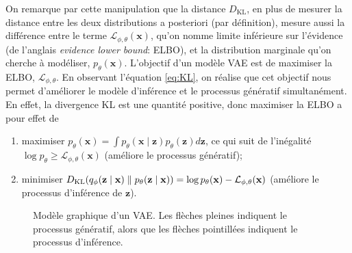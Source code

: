 On remarque par cette manipulation que la distance $D_{\mathrm{KL}}$, en plus de mesurer la distance entre 
les deux distributions a posteriori (par définition), mesure aussi la différence entre le terme 
$\mathcal{L}_{\phi,\theta}(\mathbf{x})$, qu'on nomme limite inférieure sur l'évidence (de l'anglais 
\textit{evidence lower bound}: ELBO), et la distribution marginale qu'on cherche à modéliser, $p_\theta(\mathbf{x})$. 
L'objectif d'un modèle VAE est de maximiser la ELBO, $\mathcal{L_{\phi,\theta}}$. 
En observant l'équation \eqref{eq:KL}, on réalise que cet objectif 
nous permet d'améliorer le modèle d'inférence et le processus génératif simultanément.
En effet, la divergence KL est 
une quantité positive, donc maximiser la ELBO a pour effet de
\begin{enumerate}
        \item maximiser $p_\theta(\mathbf{x}) = \int p_{\theta}(\mathbf{x} \mid \mathbf{z}) p_{\theta}(\mathbf{z}) d\mathbf{z}$, ce qui suit de l'inégalité
                $\log p_\theta \geq \mathcal{L}_{\phi,\theta}(\mathbf{x})$ (améliore le processus génératif);
        \item minimiser $D_{\mathrm{KL}}(q_\phi(\mathbf{z} \mid \mathbf{x}) \mathrel{\Vert}  p_\theta (\mathbf{z} \mid \mathbf{x})) = \log p_\theta(\mathbf{x}) - \mathcal{L}_{\phi,\theta}(\mathbf{x})$ (améliore le processus d'inférence de $\mathbf{z}$).
\end{enumerate}

\begin{figure}[H]
        \centering
        \caption{Modèle graphique d'un VAE. Les flèches pleines indiquent le processus génératif, alors que les flèches pointillées indiquent le processus d'inférence.}
        \label{fig:vae encoder}
\end{figure}

